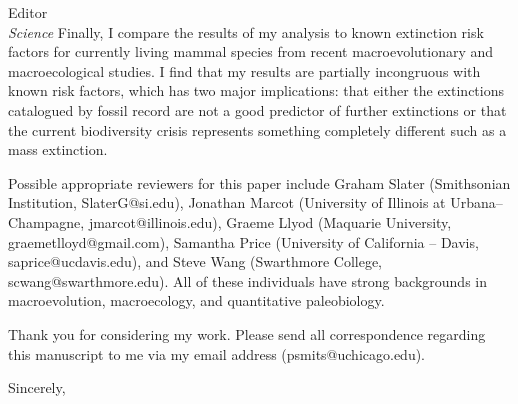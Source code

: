 \documentclass{letter}
\begin{document}
\begin{letter}{Editor \\ \textit{Science}}
  Finally, I compare the results of my analysis to known extinction risk factors for currently living mammal species from recent macroevolutionary and macroecological studies. I find that my results are partially incongruous with known risk factors, which has two major implications: that either the extinctions catalogued by fossil record are not a good predictor of further extinctions or that the current biodiversity crisis represents something completely different such as a mass extinction.

  Possible appropriate reviewers for this paper include Graham Slater (Smithsonian Institution, SlaterG@si.edu), Jonathan Marcot (University of Illinois at Urbana--Champagne, jmarcot@illinois.edu), Graeme Llyod (Maquarie University, graemetlloyd@gmail.com), Samantha Price (University of California -- Davis, saprice@ucdavis.edu), and Steve Wang (Swarthmore College, scwang@swarthmore.edu). All of these individuals have strong backgrounds in macroevolution, macroecology, and quantitative paleobiology. 

  Thank you for considering my work. Please send all correspondence regarding this manuscript to me via my email address (psmits@uchicago.edu).

  \closing{Sincerely,}

\end{letter}
\end{document}
